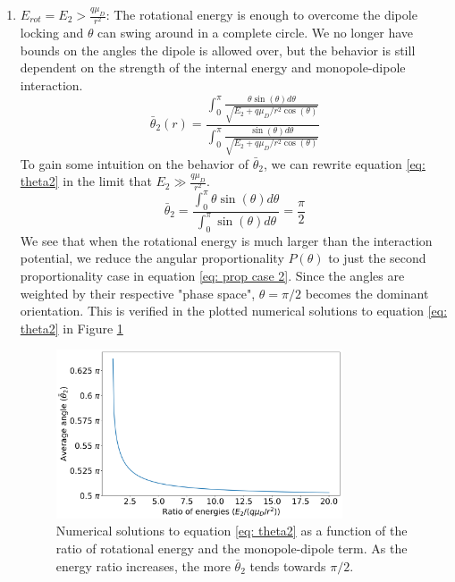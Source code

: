 \begin{enumerate}
	\item $E_{rot} = E_2 > \frac{q \mu_D}{r^2}$:
	The rotational energy is enough to overcome the dipole locking and $\theta$ can swing around in a complete circle. We no longer have bounds on the angles the dipole is allowed over, but the behavior is still dependent on the strength of the internal energy and monopole-dipole interaction.
	\begin{equation}
	    \bar{\theta}_2(r)  = \dfrac{\displaystyle\int_0^\pi \frac{\theta \sin(\theta) d\theta}{\sqrt{E_2 + q \mu_D/r^2 \cos(\theta)}}}{\displaystyle\int_0^\pi \frac{\sin(\theta) d \theta}{\sqrt{E_2 + q \mu_D/r^2 \cos(\theta)}}} \label{eq: theta2}
	\end{equation}
	To gain some intuition on the behavior of $\bar{\theta}_2$, we can rewrite equation \ref{eq: theta2} in the limit that $E_2 \gg \frac{q \mu_D}{r^2}$.
	\begin{equation*}
		\bar{\theta}_2 = \dfrac{\displaystyle\int_0^\pi \theta \sin(\theta) d\theta}{\displaystyle\int_0^\pi \sin(\theta) d \theta} = \dfrac{\pi}{2}
	\end{equation*}
	We see that when the rotational energy is much larger than the interaction potential, we reduce the angular proportionality $P(\theta)$ to just the second proportionality case in equation \ref{eq: prop case 2}. Since the angles are weighted by their respective "phase space", $\theta=\pi/2$ becomes the dominant orientation. This is verified in the plotted numerical solutions to equation \ref{eq: theta2} in Figure \ref{fig: theta2}
	\begin{figure}[H]
		\centering
		\includegraphics[width=0.8\textwidth]{images/ADO_theta2.png}
		\caption{Numerical solutions to equation \ref{eq: theta2} as a function of the ratio of rotational energy and the monopole-dipole term. As the energy ratio increases, the more $\bar{\theta}_2$ tends towards $\pi/2$.}
		\label{fig: theta2}
	\end{figure}
\end{enumerate}

